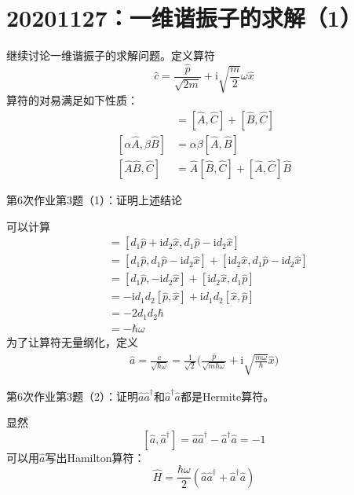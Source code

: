     \section{20201127：一维谐振子的求解（1）}
        继续讨论一维谐振子的求解问题。定义算符
        \[ \hat{c} = \frac {\hat{p}}{\sqrt{2m}} + \mathrm{i}\sqrt{\frac m2}\omega \hat{x} \]
        算符的对易满足如下性质：
        \begin{align*}
            [\hat{A}+\hat{B},\hat{C}] &= [\hat{A},\hat{C}]+[\hat{B},\hat{C}]\\
            [\alpha \hat{A}, \beta \hat{B}] &= \alpha \beta [\hat{A},\hat{B}]\\
            [\hat{A}\hat{B},\hat{C}] &= \hat{A}[\hat{B},\hat{C}] + [\hat{A},\hat{C}]\hat{B}
        \end{align*}
        \begin{asg}
            第6次作业第3题（1）：证明上述结论
        \end{asg}
        可以计算
        \begin{align*}
            [\hat{c},\hat{c}^\dagger] &= [d_1\hat{p} +\mathrm{i}d_2\hat{x}, d_1\hat{p} - \mathrm{i}d_2\hat{x}]\\
            &= [d_1\hat{p}, d_1\hat{p} - \mathrm{i}d_2\hat{x}] + [\mathrm{i}d_2\hat{x}, d_1\hat{p} - \mathrm{i}d_2\hat{x}]\\
            &= [d_1\hat{p}, -\mathrm{i}d_2\hat{x}] + [\mathrm{i}d_2\hat{x}, d_1\hat{p}]\\
            &= -\mathrm{i}d_1d_2[\hat{p},\hat{x}] + \mathrm{i}d_1d_2[\hat{x},\hat{p}]\\
            &= -2d_1d_2\hbar\\
            &= -\hbar \omega
        \end{align*}
        为了让算符无量纲化，定义
        \begin{align*}
            \hat{a} = \frac {\hat{c}}{\sqrt{\hbar \omega}} =\frac 1{\sqrt{2}} \bigg(\frac {\hat{p}}{\sqrt{m\hbar\omega}} + \mathrm{i}\sqrt{\frac {m\omega}{\hbar}} \hat{x}\bigg)
        \end{align*}
        \begin{asg}
            第6次作业第3题（2）：证明$\hat{a}\hat{a}^\dagger$和$\hat{a}^\dagger\hat{a}$都是Hermite算符。
        \end{asg}
        显然
        \[ [\hat{a},\hat{a}^\dagger] = \hat{a}\hat{a}^\dagger - \hat{a}^\dagger \hat{a} =  -1 \]
        可以用$\hat{a}$写出Hamilton算符：
        \[ \hat{H} = \frac {\hbar \omega}2 (\hat{a}\hat{a}^\dagger + \hat{a}^\dagger \hat{a}) \]

